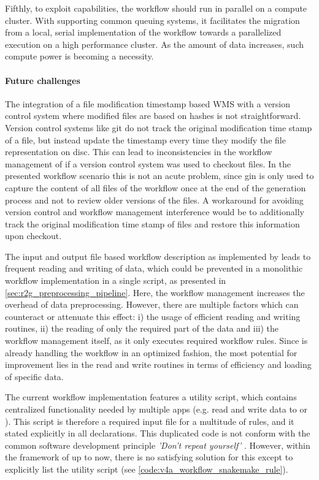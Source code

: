 Fifthly, to exploit  capabilities, the workflow should run in parallel on a compute cluster. With  supporting common queuing systems, it facilitates the migration from a local, serial implementation of the workflow towards a parallelized execution on a high performance cluster. As the amount of data increases, such compute power is becoming a necessity.

\paragraph{Future challenges}
The integration of a file modification timestamp based WMS with a version control system where modified files are based on hashes is not straightforward. Version control systems like git do not track the original modification time stamp of a file, but instead update the timestamp every time they modify the file representation on disc. This can lead to inconsistencies in the workflow management of  if a version control system was used to checkout files. In the presented workflow scenario this is not an acute problem, since gin is only used to capture the content of all files of the workflow once at the end of the generation process and not to review older versions of the files. A workaround for avoiding version control and workflow management interference would be to additionally track the original modification time stamp of files and restore this information upon checkout.

The input and output file based workflow description as implemented by  leads to frequent reading and writing of data, which could be prevented in a monolithic workflow implementation in a single script, as presented in \cref{sec:r2g_preprocessing_pipeline}. Here, the workflow management increases the overhead of data preprocessing. However, there are multiple factors which can counteract or attenuate this effect: i) the usage of efficient reading and writing routines, ii) the reading of only the required part of the data and iii) the workflow management itself, as it only executes required workflow rules. Since  is already handling the workflow in an optimized fashion, the most potential for improvement lies in the read and write routines in terms of efficiency and loading of specific data. 

The current  workflow implementation features a utility script, which contains centralized functionality needed by multiple apps (e.g. read and write data to  or ). This script is therefore a required input file for a multitude of rules, and it stated explicitly in all  declarations. This duplicated code is not conform with the common software development principle \textit{'Don't repeat yourself'} \citep{Martin_2008}. However, within the framework of  up to now, there is no satisfying solution for this except to explicitly list the utility script (see \cref{code:v4a_workflow_snakemake_rule}). 

